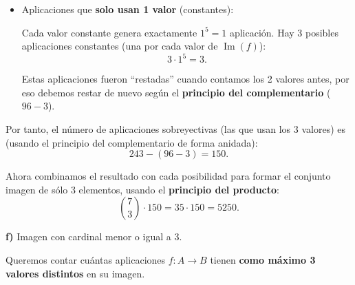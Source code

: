\documentclass[a4paper,12pt]{article}
\begin{document}
    \begin{ejercicio}[title=Ejercicio 20]
    \begin{itemize}
    \begin{itemize}
    Ahora, para cada posición del dominio $A$ (que tiene 5 elementos), hay 2 opciones posibles ($b$ o $c$). Esto es lo que llamamos el “nuevo dominio” de la aplicación restringida: ahora solo estamos eligiendo entre 2 valores.  
    Por tanto, el número de aplicaciones que no usan $a$ es
    \[
    2^5 = 32.
    \]

\vspace{0.5em}

    Lo mismo ocurre si decidimos no usar $b$ o no usar $c$. Como hay 3 valores posibles que podríamos eliminar, el total es
    \[
    3 \cdot 32 = 96.
    \]

\vspace{0.5em}

    Pero entre estas 32 aplicaciones de cada caso, algunas solo usan un valor. \\
    
    Por ejemplo, todas las posiciones asignadas a $b$ o todas asignadas a $c$. Estas aplicaciones constantes no deberían contarse aquí, porque no queremos contar aplicaciones que usan solo un valor dentro de las que deberían usar 2. Es por eso que restamos al conjunto actual ($96$) la siguiente cantidad:

    \item Aplicaciones que \textbf{solo usan 1 valor} (constantes):

\vspace{0.5em}

    Cada valor constante genera exactamente $1^5 = 1$ aplicación. Hay 3 posibles aplicaciones constantes (una por cada valor de $\operatorname{Im}(f)$):
    \[
    3 \cdot 1^5 = 3.
    \]

\vspace{0.5em}

    Estas aplicaciones fueron “restadas” cuando contamos los 2 valores antes, por eso debemos restar de nuevo según el \textbf{principio del complementario} ($96-3$).
\end{itemize}

Por tanto, el número de aplicaciones sobreyectivas (las que usan los 3 valores) es (usando el principio del complementario de forma anidada):
\[
243 - (96 - 3) = 150.
\]

\end{itemize}

Ahora combinamos el resultado con cada posibilidad para formar el conjunto imagen de sólo 3 elementos, usando el \textbf{principio del producto}:  
\[
\binom{7}{3}\cdot 150
=
35 \cdot 150
= \boxed{5250}.
\]

\textbf{f)} Imagen con cardinal menor o igual a $3$.

\vspace{0.5em}

Queremos contar cuántas aplicaciones $f : A \to B$ tienen \textbf{como máximo 3 valores distintos} en su imagen.

\end{ejercicio}
\end{document}
